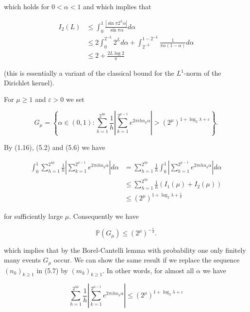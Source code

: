 \documentclass[10pt]{article}
\begin{document}
which holds for $0<\alpha<1$ and which implies that

$$
\begin{aligned}
I_{2}(L) & \leqslant \int_{0}^{1} \frac{\left|\sin \pi 2^{L} \alpha\right|}{\sin \pi \alpha} d \alpha \\
& \leqslant 2 \int_{0}^{2^{-L}} 2^{L} d \alpha+\int_{2^{-L}}^{1-2^{-L}} \frac{1}{\pi \alpha(1-\alpha)} d \alpha \\
& \leqslant 2+\frac{2 L \log 2}{\pi}
\end{aligned}
$$

(this is essentially a variant of the classical bound for the $L^{1}$-norm of the Dirichlet kernel).

For $\mu \geqslant 1$ and $\varepsilon>0$ we set


\begin{equation*}
G_{\mu}=\left\{\alpha \in(0,1): \sum_{h=1}^{2^{4 \mu}} \frac{1}{h}\left|\sum_{k=1}^{2^{\mu-1}} e^{2 \pi i h n_{k} \alpha}\right|>\left(2^{\mu}\right)^{1+\log _{2} \lambda+\varepsilon}\right\} . \tag{5.7}
\end{equation*}


By (1.16), (5.2) and (5.6) we have

$$
\begin{aligned}
\int_{0}^{1} \sum_{h=1}^{2^{4 \mu}} \frac{1}{h}\left|\sum_{k=1}^{2^{\mu-1}} e^{2 \pi i h n_{k} \alpha}\right| d \alpha & =\sum_{h=1}^{2^{4 \mu}} \frac{1}{h} \int_{0}^{1}\left|\sum_{k=1}^{2^{\mu-1}} e^{2 \pi i h n_{k} \alpha}\right| d \alpha \\
& \leqslant \sum_{h=1}^{2^{4 \mu}} \frac{1}{h}\left(I_{1}(\mu)+I_{2}(\mu)\right) \\
& \leqslant\left(2^{\mu}\right)^{1+\log _{2} \lambda+\frac{\varepsilon}{2}}
\end{aligned}
$$

for sufficiently large $\mu$. Consequently we have

$$
\mathbb{P}\left(G_{\mu}\right) \leqslant\left(2^{\mu}\right)^{-\frac{\varepsilon}{2}} .
$$

which implies that by the Borel-Cantelli lemma with probability one only finitely many events $G_{\mu}$ occur. We can show the same result if we replace the sequence $\left(n_{k}\right)_{k \geqslant 1}$ in (5.7) by $\left(m_{k}\right)_{k \geqslant 1}$. In other words, for almost all $\alpha$ we have


\begin{equation*}
\sum_{h=1}^{2^{4 \mu}} \frac{1}{h}\left|\sum_{k=1}^{2^{\mu-1}} e^{2 \pi i h n_{k} \alpha}\right| \leqslant\left(2^{\mu}\right)^{1+\log _{2} \lambda+\varepsilon} \tag{5.8}
\end{equation*}
\end{document}
